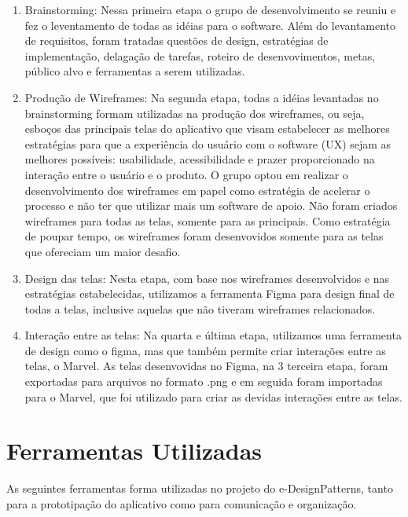 \begin{enumerate}
	\item Brainstorming: Nessa primeira etapa o grupo de desenvolvimento se reuniu e fez o leventamento de todas as idéias para o software. Além do levantamento de requisitos, foram tratadas questões de design, estratégias de implementação, delagação de tarefas, roteiro de desenvovimentos, metas, público alvo e ferramentas a serem utilizadas. 
	\item Produção de Wireframes: Na segunda etapa, todas a idéias levantadas no brainstorming formam utilizadas na produção dos wireframes, ou seja, esboços das principais telas do aplicativo que visam estabelecer as melhores estratégias para que a experiência do usuário com o software (UX) sejam as melhores possíveis: usabilidade, acessibilidade e prazer proporcionado na interação entre o usuário e o produto. O grupo optou em realizar o desenvolvimento dos wireframes em papel como estratégia de acelerar o processo e não ter que utilizar mais um software de apoio. Não foram criados wireframes para todas as telas, somente para as principais. Como estratégia de poupar tempo, os wireframes foram desenvovidos somente para as telas que ofereciam um maior desafio.
	\item Design das telas: Nesta etapa, com base nos wireframes desenvolvidos e nas estratégias estabelecidas, utilizamos a ferramenta Figma para design final de todas a telas, inclusive aquelas que não tiveram wireframes relacionados. 
	\item Interação entre as telas: Na quarta e última etapa, utilizamos uma ferramenta de design como o figma, mas que também permite criar interações entre as telas, o Marvel. As telas desenvovidas no Figma, na 3 terceira etapa, foram exportadas para arquivos no formato .png e em seguida foram importadas para o Marvel, que foi utilizado para criar as devidas interações entre as telas.
\end{enumerate}


\section{Ferramentas Utilizadas}

As seguintes ferramentas forma utilizadas no projeto do e-DesignPatterns, tanto para a prototipação do aplicativo como para comunicação e organização.

